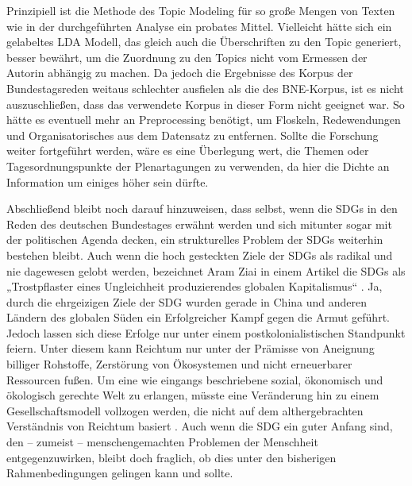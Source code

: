 \documentclass[a4paper,11pt]{article}
\begin{document}
Prinzipiell ist die Methode des Topic Modeling für so große Mengen von Texten
wie in der durchgeführten Analyse ein probates Mittel. Vielleicht hätte sich
ein gelabeltes LDA Modell, das gleich auch die Überschriften zu den Topic
generiert, besser bewährt, um die Zuordnung zu den Topics nicht vom Ermessen
der Autorin abhängig zu machen. Da jedoch die Ergebnisse des Korpus der
Bundestagsreden weitaus schlechter ausfielen als die des BNE-Korpus, ist es
nicht auszuschließen, dass das verwendete Korpus in dieser Form nicht geeignet
war. So hätte es eventuell mehr an Preprocessing benötigt, um Floskeln,
Redewendungen und Organisatorisches aus dem Datensatz zu entfernen. Sollte die
Forschung weiter fortgeführt werden, wäre es eine Überlegung wert, die Themen
oder Tagesordnungspunkte der Plenartagungen zu verwenden, da hier die Dichte
an Information um einiges höher sein dürfte.

Abschließend bleibt noch darauf hinzuweisen, dass selbst, wenn die SDGs in den
Reden des deutschen Bundestages erwähnt werden und sich mitunter sogar mit der
politischen Agenda decken, ein strukturelles Problem der SDGs weiterhin
bestehen bleibt. Auch wenn die hoch gesteckten Ziele der SDGs als radikal und
nie dagewesen gelobt werden, bezeichnet Aram Ziai in einem Artikel die SDGs
als „Trostpflaster eines Ungleichheit produzierendes globalen Kapitalismus“
\cite{Ziai}.  Ja, durch die ehrgeizigen Ziele der SDG wurden gerade in China
und anderen Ländern des globalen Süden ein Erfolgreicher Kampf gegen die Armut
geführt.  Jedoch lassen sich diese Erfolge nur unter einem
postkolonialistischen Standpunkt feiern. Unter diesem kann Reichtum nur unter
der Prämisse von Aneignung billiger Rohstoffe, Zerstörung von Ökosystemen und
nicht erneuerbarer Ressourcen fußen. Um eine wie eingangs beschriebene sozial,
ökonomisch und ökologisch gerechte Welt zu erlangen, müsste eine Veränderung
hin zu einem Gesellschaftsmodell vollzogen werden, die nicht auf dem
althergebrachten Verständnis von Reichtum basiert \cite{Ziai}. Auch wenn die
SDG ein guter Anfang sind, den -- zumeist -- menschengemachten Problemen der
Menschheit entgegenzuwirken, bleibt doch fraglich, ob dies unter den
bisherigen Rahmenbedingungen gelingen kann und sollte.
\end{document}
